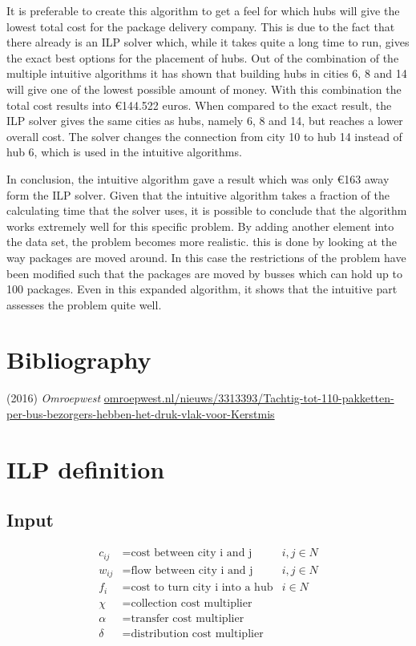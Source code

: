 \documentclass{article}
\begin{document}
It is preferable to create this algorithm to get a feel for which hubs will give the lowest total cost for the package delivery company. This is due to the fact that there already is an ILP solver which, while it takes quite a long time to run, gives the exact best options for the placement of hubs.  
Out of the combination of the multiple intuitive algorithms it has shown that building hubs in cities 6, 8 and 14 will give one of the lowest possible amount of money. With this combination the total cost results into €144.522 euros. When compared to the exact result, the ILP solver gives the same cities as hubs, namely 6, 8 and 14, but reaches a lower overall cost. The solver changes the connection from city 10 to hub 14 instead of hub 6, which is used in the intuitive algorithms. 

In conclusion, the intuitive algorithm gave a result which was only €163 away form the ILP solver. Given that the intuitive algorithm takes a fraction of the calculating time that the solver uses, it is possible to conclude that the algorithm works extremely well for this specific problem. %
By adding another element into the data set, the problem becomes more realistic. this is done by looking at the way packages are moved around. In this case the restrictions of the problem have been modified such that the packages are moved by busses which can hold up to 100 packages. Even in this expanded algorithm, it shows that the intuitive part assesses the problem quite well. 

\newpage
\section{Bibliography}
\begin{thebibliography}{9}

(2016) \textit{Omroepwest}
\url{omroepwest.nl/nieuws/3313393/Tachtig-tot-110-pakketten-per-bus-bezorgers-hebben-het-druk-vlak-voor-Kerstmis}



\end{thebibliography}

\newpage

\appendix
\section{ILP definition}
\label{ILPDef}
\subsection*{Input}
\begin{align*}
c_{ij} &= \text{cost between city i and j}  &i,j \in N\\
w_{ij} &= \text{flow between city i and j} &i,j \in N\\
f_{i} &= \text{cost to turn city i into a hub} &i \in N\\
\chi &= \text{collection cost multiplier} \\
\alpha &= \text{transfer cost multiplier} \\
\delta &= \text{distribution cost multiplier} \\
\end{align*}
\end{document}
